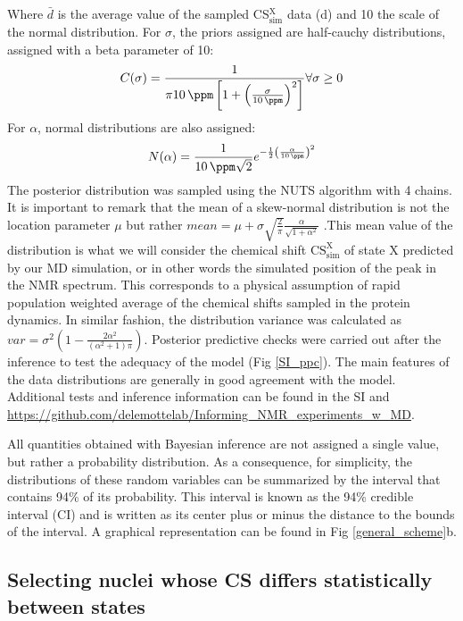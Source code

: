 \documentclass[%
 aip,
 amsmath,amssymb,
 preprint,%
]{revtex4-1}
\begin{document}
Where $\bar{d}$ is the average value of the sampled CS$_\text{sim}^\text{X}$ data (d) and \SI{10}{\ppm} the scale of the normal distribution. 
For $\sigma$, the priors assigned are half-cauchy distributions, assigned with a beta parameter of \SI{10}{\ppm}:
\begin{equation}
    C(\sigma)=\frac{1}
    {\pi\SI{10}{\ppm}\left[ 
    1+\left(
    \frac{\sigma}{\SI{10}{\ppm}}
    \right)^2\right]
    }
    \forall \sigma \geq 0
\end{equation}
For $\alpha$, normal distributions are also assigned:
\begin{equation}
    N(\alpha)=\frac{1}{\SI{10}{\ppm}\sqrt{2}}e^{-\frac{1}{2}\left(
    \frac{\alpha}{\SI{10}{\ppm}}
    \right)^2}
\end{equation}
The posterior distribution was sampled using the NUTS\cite{sanjeevi2017nuts} algorithm with 4 chains. It is important to remark that the mean of a skew-normal distribution is not the location parameter $\mu$ but rather $mean = \mu + \sigma\sqrt{\frac{2}{\pi}}\frac{\alpha}{\sqrt{1+\alpha^2}}$ .This mean value of the distribution is what we will consider the chemical shift $\text{CS}_{\text{sim}}^{\text{X}}$ of state X predicted by our MD simulation, or in other words the simulated position of the peak in the NMR spectrum. This corresponds to a physical assumption of rapid population weighted average of the chemical shifts sampled in the protein dynamics. In similar fashion, the distribution variance was calculated as $var = \sigma^2\left(1-\frac{2\alpha^2}{\left(\alpha^2+1\right)\pi}\right)$. Posterior predictive checks were carried out after the inference to test the adequacy of the model (Fig \ref{SI_ppc}). The main features of the data distributions are generally in good agreement with the model. Additional tests and inference information can be found in the SI and \url{https://github.com/delemottelab/Informing_NMR_experiments_w_MD}. 

All quantities obtained with Bayesian inference are not assigned a single value, but rather a probability distribution. As a consequence, for simplicity, the distributions of these random variables can be summarized by the interval that contains 94\% of its probability. This interval is known as the 94\% credible interval (CI) and is written as its center plus or minus the distance to the bounds of the interval. A graphical representation can be found in Fig \ref{general_scheme}b. 

\subsection{Selecting nuclei whose CS differs statistically between states}
\end{document}
